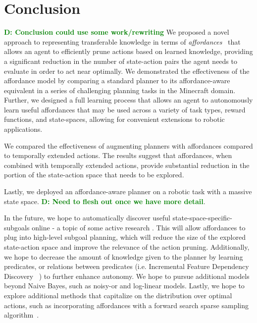 \documentclass[conference]{IEEEtran}
\newcommand{\dnote}[1]{\textcolor{Green}{\textbf{D: #1}}}
\begin{document}
\section{Conclusion}
\label{sec:conclusion}
\dnote{Conclusion could use some work/rewriting}
We proposed a novel approach to representing transferable knowledge in terms of
{\em affordances}~\cite{gibson77} that allows an agent to efficiently prune actions 
based on learned knowledge, providing a significant reduction in the number of state-action
pairs the agent needs to evaluate in order to act near optimally. We demonstrated the 
effectiveness of the affordance model by comparing a standard planner to its affordance-aware
equivalent in a series of challenging planning tasks in the Minecraft domain. Further, we designed
a full learning process that allows an agent to autonomously learn useful affordances that may be used
across a variety of task types, reward functions, and state-spaces, allowing for convenient extensions 
to robotic applications.

We compared the effectiveness of augmenting planners with affordances compared to 
temporally extended actions. The results suggest that affordances, when combined with 
temporally extended actions, provide substantial reduction in the portion of the state-action 
space that needs to be explored.

Lastly, we deployed an affordance-aware planner on a robotic task with a massive 
state space. \dnote{Need to flesh out once we have more detail}.

In the future, we hope to automatically discover useful state-space-specific-subgoals online 
- a topic of some active research \cite{Mcgovern01automaticdiscovery,Simsek:2005:IUS:1102351.1102454}.
This will allow affordances to plug into high-level subgoal planning, which will reduce the size of the 
explored state-action space and improve the relevance of the action pruning. Additionally, we hope to 
decrease the amount of knowledge given to the planner by learning predicates, or relations between predicates (i.e. Incremental Feature Dependency Discovery ~\cite{ICML2011Geramifard_473}) to further enhance autonomy. We hope to pursue additional models beyond Naive Bayes, such as noisy-or and log-linear models. Lastly, we hope to explore additional methods that capitalize on the distribution over optimal actions, such as incorporating affordances with a forward search sparse sampling algorithm~\cite{walsh2010integrating}.

{\small


}
\end{document}
